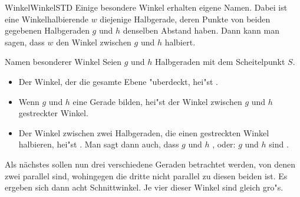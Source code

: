 \begin{MXContent}{Winkel}{Winkel}{STD}
Einige besondere Winkel erhalten eigene Namen.
Dabei ist eine Winkelhalbierende $w$ diejenige Halbgerade, deren Punkte von 
beiden gegebenen Halbgeraden $g$ und $h$ denselben Abstand haben. Dann kann 
man sagen, dass $w$ den Winkel zwischen $g$ und $h$ halbiert.

\begin{MXInfo}{Namen besonderer Winkel}
Seien $g$ und $h$ Halbgeraden mit dem Scheitelpunkt $S$.
\begin{itemize}
\item
Der Winkel, der die gesamte Ebene "uberdeckt, hei"st 
.
\item
Wenn $g$ und $h$ eine Gerade bilden, hei"st der Winkel zwischen $g$ und $h$
gestreckter Winkel.
\item
Der Winkel zwischen zwei Halbgeraden, die einen gestreckten Winkel halbieren,
hei"st . 
Man sagt dann auch, dass $g$ und $h$ 
, oder: 
$g$ und $h$ sind . 
\end{itemize}
\end{MXInfo}

Als n\"achstes sollen nun drei verschiedene Geraden betrachtet werden, 
von denen zwei parallel sind, wohingegen die dritte nicht parallel zu diesen 
beiden ist. Es ergeben sich dann acht Schnittwinkel.
Je vier dieser Winkel sind gleich gro"s.


\end{MXContent}
